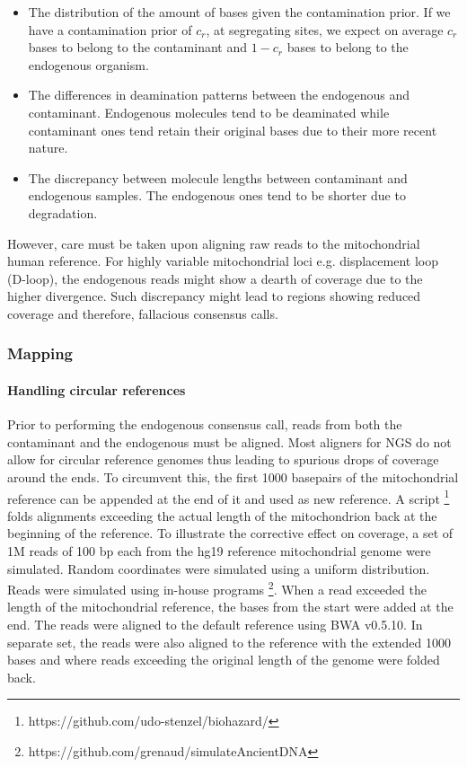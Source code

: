 \documentclass[a4paper,12pt]{article}
\begin{document}


\begin{itemize}
\item The distribution of the amount of bases given the contamination prior. If we have a contamination prior of $c_r$, at segregating sites, we expect on average $c_r$ bases to belong to the contaminant and $1-c_r$ bases to belong to the endogenous organism.
\item The differences in deamination patterns between the endogenous and contaminant. Endogenous molecules tend to be deaminated while contaminant ones tend retain their original bases due to their more recent nature. 
\item The discrepancy between molecule lengths between contaminant and endogenous samples. The endogenous ones tend to be shorter due to degradation.
\end{itemize}

However, care must be taken upon aligning raw reads to the mitochondrial human reference. For highly variable mitochondrial loci e.g. displacement loop (D-loop), the endogenous reads might show a dearth of coverage due to the higher divergence. Such discrepancy might lead to regions showing reduced coverage and therefore, fallacious consensus calls.












\subsubsection{Mapping}
\label{sec:methodsmapping}
\noindent \paragraph{Handling circular references}

Prior to performing the endogenous consensus call, reads from both the contaminant and the endogenous must be aligned. Most aligners for NGS do not allow for circular reference genomes thus leading to spurious drops of coverage around the ends. To circumvent this, the first 1000 basepairs  of the mitochondrial reference can be appended at the end of it and used as new reference. A script \footnote{https://github.com/udo-stenzel/biohazard/} folds alignments exceeding the actual length of the mitochondrion back at the beginning of the reference. To illustrate the corrective effect on coverage, a set of 1M reads of 100 bp each from the hg19 reference mitochondrial genome were simulated. Random coordinates were simulated using a uniform distribution. Reads were simulated using in-house programs \footnote{https://github.com/grenaud/simulateAncientDNA}. When a read exceeded the length of the mitochondrial reference, the bases from the start were added at the end. The reads were aligned to the default reference using BWA v0.5.10\cite{li2009fast}.  In separate set, the reads were also aligned to the reference with the extended 1000 bases and where reads exceeding the original length of the genome were folded back. 
\end{document}
